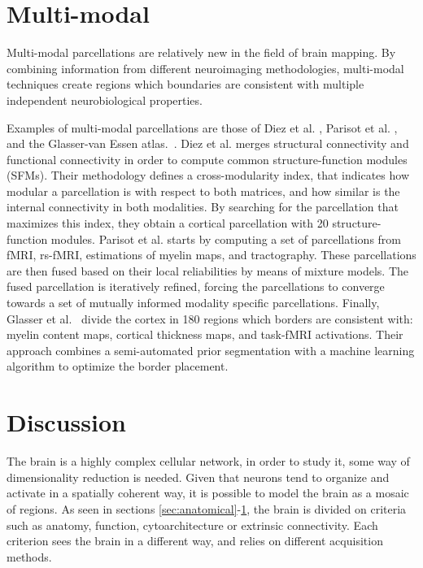 \section{Multi-modal}
\label{sec:multimodal}
Multi-modal parcellations are relatively new in the field of brain mapping.
By combining information from different neuroimaging methodologies, multi-modal
techniques create regions which boundaries are consistent with multiple
independent neurobiological properties.

Examples of multi-modal parcellations are those of Diez et al. \cite{Diez2014},
Parisot et al. \cite{Parisot2017}, and the Glasser-van Essen atlas.~\cite{Glasser2016}. 
Diez et al. \cite{Diez2014} merges structural connectivity and functional
connectivity in order to compute common structure-function modules (SFMs).
Their methodology defines a cross-modularity index, that indicates how
modular a parcellation is with respect to both matrices, and how similar is the
internal connectivity in both modalities. By searching for the parcellation
that maximizes this index, they obtain a cortical parcellation with 20 structure-function
modules. Parisot et al. \cite{Parisot2017} starts by computing a set of
parcellations from fMRI, rs-fMRI, estimations of myelin maps, and tractography.
These parcellations are then fused based on their local reliabilities by means of
mixture models. The fused parcellation is iteratively refined, forcing 
the parcellations to converge towards a set of mutually informed modality specific
parcellations. Finally, Glasser et al.~\cite{Glasser2016}
divide the cortex in 180 regions which borders are consistent with: 
myelin content maps, cortical thickness maps, and task-fMRI activations. Their
approach combines a semi-automated prior segmentation with a machine learning
algorithm to optimize the border placement.

\vspace{10px}

\section{Discussion}

The brain is a highly complex cellular network, in order to study it, some
way of dimensionality reduction is needed. Given that neurons tend to organize
and activate in a spatially coherent way, it is possible to model the brain as a
mosaic of regions. As seen in sections \ref{sec:anatomical}-\ref{sec:multimodal},
the brain is divided on criteria such as anatomy, function, cytoarchitecture or
extrinsic connectivity. Each criterion sees the brain in a different way, and
relies on different acquisition methods. 

